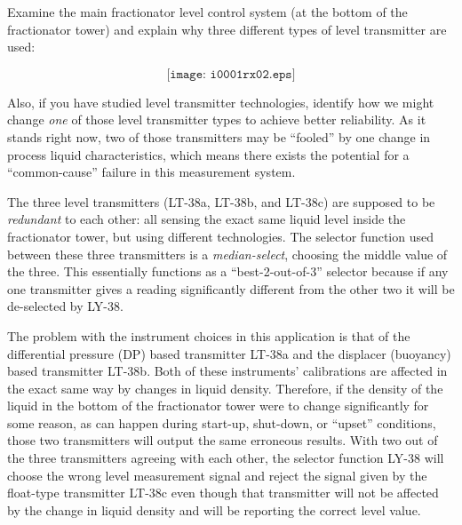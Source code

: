 

Examine the main fractionator level control system (at the bottom of the fractionator tower) and explain why three different types of level transmitter are used:

$$\texttt{[image: i0001rx02.eps]}$$

Also, if you have studied level transmitter technologies, identify how we might change {\it one} of those level transmitter types to achieve better reliability.  As it stands right now, two of those transmitters may be ``fooled'' by one change in process liquid characteristics, which means there exists the potential for a ``common-cause'' failure in this measurement system.







The three level transmitters (LT-38a, LT-38b, and LT-38c) are supposed to be {\it redundant} to each other: all sensing the exact same liquid level inside the fractionator tower, but using different technologies.  The selector function used between these three transmitters is a {\it median-select}, choosing the middle value of the three.  This essentially functions as a ``best-2-out-of-3'' selector because if any one transmitter gives a reading significantly different from the other two it will be de-selected by LY-38.
 
\vskip 10pt

The problem with the instrument choices in this application is that of the differential pressure (DP) based transmitter LT-38a and the displacer (buoyancy) based transmitter LT-38b.  Both of these instruments' calibrations are affected in the exact same way by changes in liquid density.  Therefore, if the density of the liquid in the bottom of the fractionator tower were to change significantly for some reason, as can happen during start-up, shut-down, or ``upset'' conditions, those two transmitters will output the same erroneous results.  With two out of the three transmitters agreeing with each other, the selector function LY-38 will choose the wrong level measurement signal and reject the signal given by the float-type transmitter LT-38c even though that transmitter will not be affected by the change in liquid density and will be reporting the correct level value.

